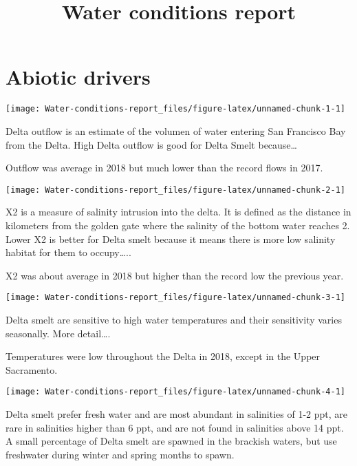 \documentclass[]{article}
\title{Water conditions report}
\author{}
\date{}
\begin{document}
\maketitle

\hypertarget{abiotic-drivers}{%
\section{Abiotic drivers}\label{abiotic-drivers}}

\begin{center}\texttt{[image: Water-conditions-report\_files/figure-latex/unnamed-chunk-1-1]} \end{center}

Delta outflow is an estimate of the volumen of water entering San
Francisco Bay from the Delta. High Delta outflow is good for Delta Smelt
because\ldots{}

Outflow was average in 2018 but much lower than the record flows in
2017.

\begin{center}\texttt{[image: Water-conditions-report\_files/figure-latex/unnamed-chunk-2-1]} \end{center}

X2 is a measure of salinity intrusion into the delta. It is defined as
the distance in kilometers from the golden gate where the salinity of
the bottom water reaches 2. Lower X2 is better for Delta smelt because
it means there is more low salinity habitat for them to occupy\ldots{}..

X2 was about average in 2018 but higher than the record low the previous
year.

\begin{center}\texttt{[image: Water-conditions-report\_files/figure-latex/unnamed-chunk-3-1]} \end{center}

Delta smelt are sensitive to high water temperatures and their
sensitivity varies seasonally. More detail\ldots{}.

Temperatures were low throughout the Delta in 2018, except in the Upper
Sacramento.

\begin{center}\texttt{[image: Water-conditions-report\_files/figure-latex/unnamed-chunk-4-1]} \end{center}

Delta smelt prefer fresh water and are most abundant in salinities of
1-2 ppt, are rare in salinities higher than 6 ppt, and are not found in
salinities above 14 ppt. A small percentage of Delta smelt are spawned
in the brackish waters, but use freshwater during winter and spring
months to spawn.
\end{document}
